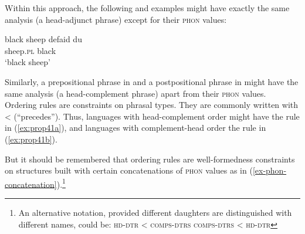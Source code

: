 \documentclass[output=paper
	        ,collection
	        ,collectionchapter
 	        ,biblatex
                ,babelshorthands
                ,newtxmath
                ,draftmode
                ,colorlinks, citecolor=brown
]{langscibook}
\begin{document}
\eal
\label{ex:prop39}\label{ex-phon-concatenation}
\ex
{}
\ex
{}
\zl

\noindent
Within this approach, the following  and  examples might have exactly the same analysis (a head-adjunct phrase) except for their \textsc{phon} values:

\eal\label{ex:prop40}
\ex\label{ex:prop40a}
black sheep
\ex\label{ex:prop40b}
\gll defaid            du\\
     sheep.\textsc{pl} black\\
\glt `black sheep'
\zl

\noindent
Similarly, a prepositional phrase in  and a postpositional phrase in  might have the same analysis (a head-complement phrase) apart from their \textsc{phon} values. Ordering rules are constraints on phrasal types. They are commonly written with < (``precedes''). Thus, languages with head-complement order might have the rule in (\ref{ex:prop41a}), and languages with complement-head order the rule in (\ref{ex:prop41b}).

\eal\label{ex:prop41}
\ex\label{ex:prop41a}
\ex\label{ex:prop41b}
\zl
%
But it should be remembered that ordering rules are well-formedness constraints on structures built with certain concatenations of \textsc{phon} values as in (\ref{ex-phon-concatenation}).\footnote{%
   An alternative notation, provided different daughters are distinguished with different names, could be:
   \eal
   \ex \textsc{hd-dtr} < \textsc{comps-dtrs}
   \ex \textsc{comps-dtrs} < \textsc{hd-dtr}
   \zllast
}
\end{document}
